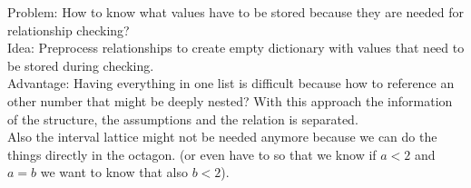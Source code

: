 \documentclass[11pt]{article}
\begin{document}
Problem: How to know what values have to be stored because they are needed for relationship checking?\\
Idea: Preprocess relationships to create empty dictionary with values that need to be stored during checking.\\

Advantage: Having everything in one list is difficult because how to reference an other number that might be deeply nested? With this approach the information of the structure, the assumptions and the relation is separated.\\
Also the interval lattice might not be needed anymore because we can do the things directly in the octagon. (or even have to so that we know if $a < 2$ and $a = b$ we want to know that also $b < 2$).
\end{document}
